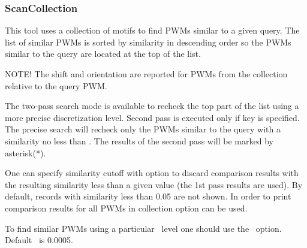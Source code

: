 \subsubsection{ScanCollection}
This tool uses a collection of motifs to find PWMs similar to a given query. 
The list of similar PWMs is sorted by similarity in descending order so the PWMs similar to the query are 
located at the top of the list.

NOTE! The shift and orientation are reported for PWMs from the collection relative to the query 
PWM.


The two-pass search mode is available to recheck the top part of the list using a more precise discretization level. Second pass is executed only 
if 
key is specified. The precise search will recheck only the PWMs 
similar to the query with a similarity no less than . The results of the second pass 
will be marked by asterisk(*).

One can specify similarity cutoff with option  to discard 
comparison results with the resulting similarity less than a given value (the 1st pass results are used). 
By default, records with similarity less than 0.05 are not shown.
In order to print comparison results for all PWMs in collection  option can be used.


To find similar PWMs using a particular \pvalue\ level one should use the ~option. Default \pvalue\ is 0.0005.

\exampleof{}
